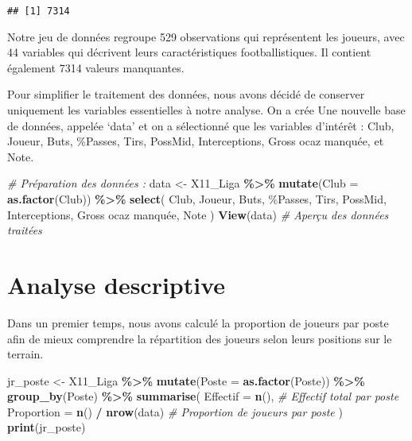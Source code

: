 \documentclass[
]{article}
\newenvironment{Shaded}{\begin{snugshade}}{\end{snugshade}}
\newcommand{\AttributeTok}[1]{\textcolor[rgb]{0.13,0.29,0.53}{#1}}
\newcommand{\CommentTok}[1]{\textcolor[rgb]{0.56,0.35,0.01}{\textit{#1}}}
\newcommand{\FunctionTok}[1]{\textcolor[rgb]{0.13,0.29,0.53}{\textbf{#1}}}
\newcommand{\NormalTok}[1]{#1}
\newcommand{\OtherTok}[1]{\textcolor[rgb]{0.56,0.35,0.01}{#1}}
\newcommand{\SpecialCharTok}[1]{\textcolor[rgb]{0.81,0.36,0.00}{\textbf{#1}}}
\newcommand{\StringTok}[1]{\textcolor[rgb]{0.31,0.60,0.02}{#1}}
\begin{document}
\begin{verbatim}
## [1] 7314
\end{verbatim}

Notre jeu de données regroupe 529 observations qui représentent les
joueurs, avec 44 variables qui décrivent leurs caractéristiques
footballistiques. Il contient également 7314 valeurs manquantes.

Pour simplifier le traitement des données, nous avons décidé de
conserver uniquement les variables essentielles à notre analyse. On a
crée Une nouvelle base de données, appelée `data' et on a sélectionné
que les variables d'intérêt : Club, Joueur, Buts, \%Passes, Tirs,
PossMid, Interceptions, Gross ocaz manquée, et Note.

\begin{Shaded}
\begin{Highlighting}[]
\CommentTok{\# Préparation des données : }
\NormalTok{data }\OtherTok{\textless{}{-}}\NormalTok{ X11\_Liga }\SpecialCharTok{\%\textgreater{}\%} 
  \FunctionTok{mutate}\NormalTok{(}\AttributeTok{Club =} \FunctionTok{as.factor}\NormalTok{(Club)) }\SpecialCharTok{\%\textgreater{}\%} 
  \FunctionTok{select}\NormalTok{(}
\NormalTok{    Club, Joueur, Buts, }\StringTok{\textasciigrave{}}\AttributeTok{\%Passes}\StringTok{\textasciigrave{}}\NormalTok{, Tirs, PossMid, Interceptions, }
    \StringTok{\textasciigrave{}}\AttributeTok{Gross ocaz manquée}\StringTok{\textasciigrave{}}\NormalTok{, Note}
\NormalTok{  )}
\FunctionTok{View}\NormalTok{(data)  }\CommentTok{\# Aperçu des données traitées}
\end{Highlighting}
\end{Shaded}

\section{Analyse descriptive}\label{analyse-descriptive}

Dans un premier temps, nous avons calculé la proportion de joueurs par
poste afin de mieux comprendre la répartition des joueurs selon leurs
positions sur le terrain.

\begin{Shaded}
\begin{Highlighting}[]
\NormalTok{jr\_poste }\OtherTok{\textless{}{-}}\NormalTok{ X11\_Liga }\SpecialCharTok{\%\textgreater{}\%} 
  \FunctionTok{mutate}\NormalTok{(}\AttributeTok{Poste =} \FunctionTok{as.factor}\NormalTok{(Poste)) }\SpecialCharTok{\%\textgreater{}\%}  
  \FunctionTok{group\_by}\NormalTok{(Poste) }\SpecialCharTok{\%\textgreater{}\%}                  
  \FunctionTok{summarise}\NormalTok{(}
    \AttributeTok{Effectif =} \FunctionTok{n}\NormalTok{(),                     }\CommentTok{\# Effectif total par poste}
    \AttributeTok{Proportion =} \FunctionTok{n}\NormalTok{() }\SpecialCharTok{/} \FunctionTok{nrow}\NormalTok{(data)       }\CommentTok{\# Proportion de joueurs par poste}
\NormalTok{  )}
\FunctionTok{print}\NormalTok{(jr\_poste)}
\end{Highlighting}
\end{Shaded}
\end{document}
